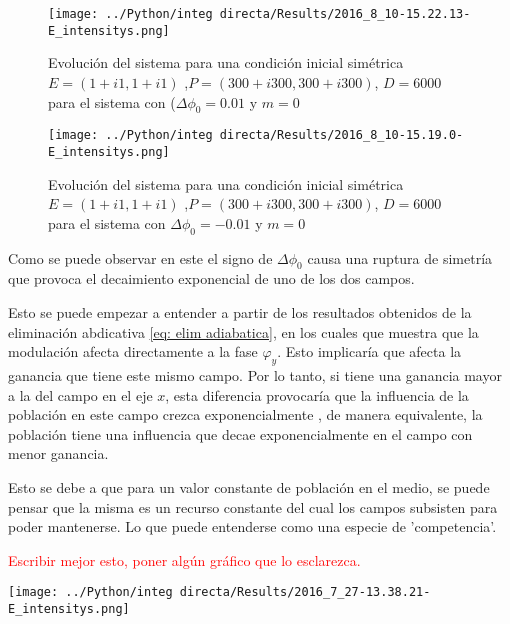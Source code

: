 		\begin{figure}[htc]
			\texttt{[image: ../Python/integ directa/Results/2016\_8\_10-15.22.13-E\_intensitys.png]}
			\caption{Evolución del sistema para una condición inicial simétrica $E=(1+i1,1+i1)$ ,$ P=(300+i300,300+i300)$, $D=6000$ para el sistema con ($\Delta \phi_0=0.01$ y  $m=0$}
			\label{fig: ci delta phi 0.01}
		\end{figure}
		\begin{figure}[htc]
			\texttt{[image: ../Python/integ directa/Results/2016\_8\_10-15.19.0-E\_intensitys.png]}
			\caption{Evolución del sistema para una condición inicial simétrica $E=(1+i1,1+i1)$ ,$ P=(300+i300,300+i300)$, $D=6000$ para el sistema con $\Delta \phi_0=-0.01$ y $m=0$}
			\label{fig: ci delta phi -0.01}
		\end{figure}
		
		Como se puede observar en este el signo de $\Delta \phi_0$ causa una ruptura de simetría que provoca el decaimiento exponencial de uno de los dos campos.
		
		Esto se puede empezar a entender a partir de los resultados obtenidos de la eliminación abdicativa \ref{eq: elim adiabatica}, en los cuales que muestra que la modulación afecta directamente a la fase $\varphi_y$. Esto implicaría que afecta la ganancia que tiene este mismo campo. Por lo tanto, si tiene una ganancia mayor a la del campo en el eje $x$, esta diferencia provocaría que la influencia de la población en este campo crezca exponencialmente , de manera equivalente, la población tiene una influencia que decae exponencialmente en el campo con menor ganancia.
		
		Esto se debe a que para un valor constante de población en el medio, se puede pensar que la misma es un recurso constante del cual los campos subsisten para poder mantenerse. Lo que puede entenderse como una especie de  'competencia'.
		
		\textcolor{red}{Escribir mejor esto, poner algún gráfico que lo esclarezca.}	
		
		
		\begin{center}
			\texttt{[image: ../Python/integ directa/Results/2016\_7\_27-13.38.21-E\_intensitys.png]}
		\end{center}
		
		
		
